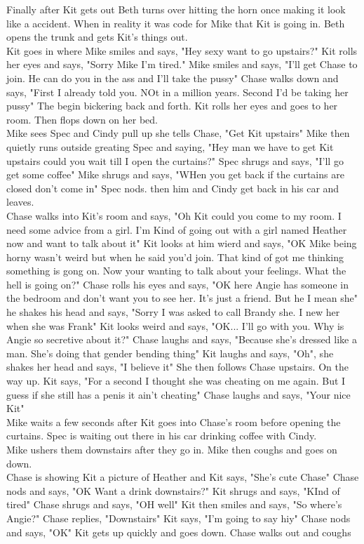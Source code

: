 \documentclass{article}[12px]
\begin{document}
	Finally after Kit gets out Beth turns over hitting the horn once making it look like a accident. When in reality it was code for Mike that Kit is going in. Beth opens the trunk and gets Kit's things out. \\

	Kit goes in where Mike smiles and says, "Hey sexy want to go upstairs?" Kit rolls her eyes and says, "Sorry Mike I'm tired." Mike smiles and says, "I'll get Chase to join. He can do you in the ass and I'll take the pussy" Chase walks down and says, "First I already told you. NOt in a million years. Second I'd be taking her pussy" The begin bickering back and forth. Kit rolls her eyes and goes to her room. Then flops down on her bed.\\

	Mike sees Spec and Cindy pull up she tells Chase, "Get Kit upstairs" Mike then quietly runs outside greating Spec and saying, "Hey man we have to get Kit upstairs could you wait till I open the curtains?" Spec shrugs and says, "I'll go get some coffee" Mike shrugs and says, "WHen you get back if the curtains are closed don't come in" Spec nods. then him and Cindy get back in his car and leaves.\\

	Chase walks into Kit's room and says, "Oh Kit could you come to my room. I need some advice from a girl. I'm Kind of going out with a girl named Heather now and want to talk about it" Kit looks at him wierd and says, "OK Mike being horny wasn't weird but when he said you'd join. That kind of got me thinking something is gong on. Now your wanting to talk about your feelings. What the hell is going on?" Chase rolls his eyes and says, "OK here Angie has someone in the bedroom and don't want you to see her. It's just a friend. But he I mean she" he shakes his head and says, "Sorry I was asked to call Brandy she. I new her when she was Frank" Kit looks weird and says, "OK... I'll go with you. Why is Angie so secretive about it?" Chase laughs and says, "Because she's dressed like a man. She's doing that gender bending thing" Kit laughs and says, "Oh", she shakes her head and says, "I believe it" She then follows Chase upstairs. On the way up. Kit says, "For a second I thought she was cheating on me again. But I guess if she still has a penis it ain't cheating" Chase laughs and says, "Your nice Kit"\\

	Mike waits a few seconds after Kit goes into Chase's room before opening the curtains. Spec is waiting out there in his car drinking coffee with Cindy.\\

	Mike ushers them downstairs after they go in. Mike then coughs and goes on down.\\

	Chase is showing Kit a picture of Heather and Kit says, "She's cute Chase" Chase nods and says, "OK Want a drink downstairs?" Kit shrugs and says, "KInd of tired" Chase shrugs and says, "OH well" Kit then smiles and says, "So where's Angie?" Chase replies, "Downstairs" Kit says, "I'm going to say hiy" Chase nods and says, "OK" Kit gets up quickly and goes down. Chase walks out and coughs
\end{document}
